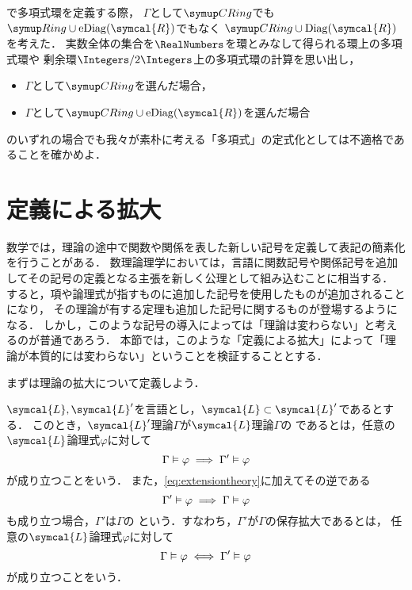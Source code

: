 \begin{Que} \label{Que:polynomialringherbrandmodel}
	で多項式環を定義する際，
	\(\Gamma\)として\(\CRing\)でも\(\Ring \cup \apply{\eDiag}{\symcal{R}}\)でもなく
	\(\CRing \cup \apply{\Diag}{\symcal{R}}\)を考えた．
	実数全体の集合を\(\RealNumbers\)を環とみなして得られる環上の多項式環や
	剰余環\(\Integers/2\Integers\)上の多項式環の計算を思い出し，
	\begin{itemize}
		\item \(\Gamma\)として\(\CRing\)を選んだ場合，
		\item \(\Gamma\)として\(\CRing \cup \apply{\eDiag}{\symcal{R}}\)を選んだ場合
	\end{itemize}
	のいずれの場合でも我々が素朴に考える「多項式」の定式化としては不適格であることを確かめよ．
\end{Que}


\section{定義による拡大} \label{sec:extensionbydefinition}

数学では，理論の途中で関数や関係を表した新しい記号を定義して表記の簡素化を行うことがある．
数理論理学においては，言語に関数記号や関係記号を追加してその記号の定義となる主張を新しく公理として組み込むことに相当する．
すると，項や論理式が指すものに追加した記号を使用したものが追加されることになり，
その理論が有する定理も追加した記号に関するものが登場するようになる．
しかし，このような記号の導入によっては「理論は変わらない」と考えるのが普通であろう．
本節では，このような「定義による拡大」によって「理論が本質的には変わらない」ということを検証することとする．

まずは理論の拡大について定義しよう．

\begin{Def} \label{Def:extensiontheory}
	\(\symcal{L}, \symcal{L}'\)を言語とし，\(\symcal{L} \subset \symcal{L}'\)であるとする．
	このとき，\(\symcal{L}'\)理論\(\Gamma\)が\(\symcal{L}\)理論\(\Gamma\)の%
	であるとは，任意の\(\symcal{L}\)論理式\(\varphi\)に対して
	\begin{equation}
		\Gamma \vDash \varphi \implies \Gamma' \vDash \varphi
		\label{eq:extensiontheory}
	\end{equation}
	が成り立つことをいう．
	また，\cref{eq:extensiontheory}に加えてその逆である
	\begin{equation}
		\Gamma' \vDash \varphi \implies \Gamma \vDash \varphi
		\label{eq:conservationextensiontheoryoneside}
	\end{equation}
	も成り立つ場合，\(\Gamma'\)は\(\Gamma\)の%
	という．すなわち，\(\Gamma'\)が\(\Gamma\)の保存拡大であるとは，
	任意の\(\symcal{L}\)論理式\(\varphi\)に対して
	\begin{equation}
		\Gamma \vDash \varphi \iff \Gamma' \vDash \varphi
		\label{eq:conservationextensiontheory}
	\end{equation}
	が成り立つことをいう．
\end{Def}

